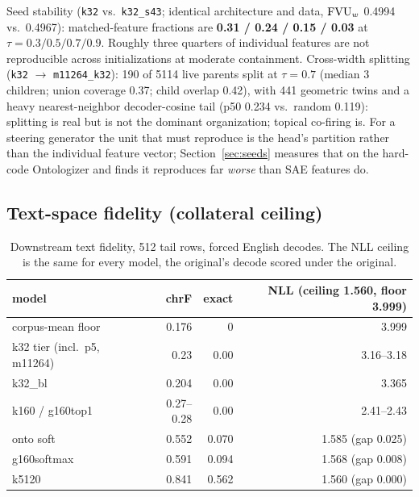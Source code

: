 Seed stability (\texttt{k32} vs.\ \texttt{k32\_s43}; identical
architecture and data, $\mathrm{FVU}_w$ 0.4994 vs.\ 0.4967): matched-feature
fractions are \textbf{0.31 / 0.24 / 0.15 / 0.03} at
$\tau{=}0.3/0.5/0.7/0.9$. Roughly three quarters of individual features
are not reproducible across initializations at moderate containment.
Cross-width splitting (\texttt{k32} $\to$ \texttt{m11264\_k32}): 190 of
5114 live parents split at $\tau{=}0.7$ (median 3 children; union
coverage 0.37; child overlap 0.42), with 441 geometric twins and a
heavy nearest-neighbor decoder-cosine tail (p50 0.234 vs.\ random
0.119): splitting is real but is not the dominant organization; topical
co-firing is. For a steering generator the unit that must reproduce is
the head's partition rather than the individual feature vector;
Section~\ref{sec:seeds} measures that on the hard-code Ontologizer and
finds it reproduces far \emph{worse} than SAE features do.

\subsection{Text-space fidelity (collateral ceiling)}
\label{sec:textfid}

\begin{table}[htbp]\centering\small
\begin{tabular}{@{}lrrr@{}}
\toprule
model & chrF & exact & NLL (ceiling 1.560, floor 3.999) \\
\midrule
corpus-mean floor & 0.176 & 0 & 3.999 \\
k32 tier (incl.\ p5, m11264) & 0.23 & 0.00 & 3.16--3.18 \\
k32\_bl          & 0.204 & 0.00 & 3.365 \\
k160 / g160top1  & 0.27--0.28 & 0.00 & 2.41--2.43 \\
onto soft        & 0.552 & 0.070 & 1.585 (gap 0.025) \\
g160softmax      & 0.591 & 0.094 & 1.568 (gap 0.008) \\
k5120            & 0.841 & 0.562 & 1.560 (gap 0.000) \\
\bottomrule
\end{tabular}
\caption{Downstream text fidelity, 512 tail rows, forced English decodes.
The NLL ceiling is the same for every model, the original's decode
scored under the original.}
\end{table}

